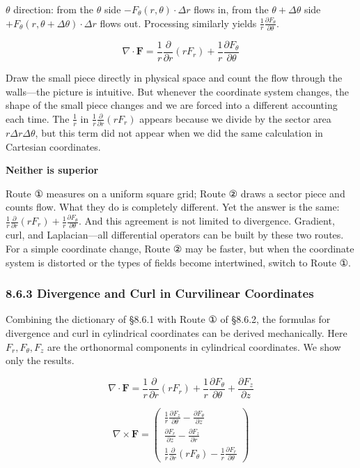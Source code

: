 \documentclass[a4paper,12pt,openany]{book}
\begin{document}
\(\theta\) direction: from the \(\theta\) side
\(-F_\theta(r,\theta) \cdot \Delta r\) flows in, from the
\(\theta+\Delta\theta\) side
\(+F_\theta(r,\theta+\Delta\theta) \cdot \Delta r\) flows out.
Processing similarly yields
\(\frac{1}{r}\frac{\partial F_\theta}{\partial\theta}\).

\[\nabla \cdot \mathbf{F} = \frac{1}{r}\frac{\partial}{\partial r}(r F_r) + \frac{1}{r}\frac{\partial F_\theta}{\partial \theta}\]

Draw the small piece directly in physical space and count the flow
through the walls—the picture is intuitive. But whenever the
coordinate system changes, the shape of the small piece changes and we
are forced into a different accounting each time. The \(\frac{1}{r}\) in
\(\frac{1}{r}\frac{\partial}{\partial r}(rF_r)\) appears because we
divide by the sector area \(r\Delta r\Delta\theta\), but this term did
not appear when we did the same calculation in Cartesian coordinates.

\textbf{Neither is superior}

Route ① measures on a uniform square grid; Route ② draws a sector piece
and counts flow. What they do is completely different. Yet the answer is
the same:
\(\frac{1}{r}\frac{\partial}{\partial r}(rF_r) + \frac{1}{r}\frac{\partial F_\theta}{\partial\theta}\).
And this agreement is not limited to divergence. Gradient, curl, and
Laplacian—all differential operators can be built by these two routes.
For a simple coordinate change, Route ② may be faster, but when the
coordinate system is distorted or the types of fields become
intertwined, switch to Route ①.

\hypertarget{divergence-and-curl-in-curvilinear-coordinates}{%
\subsubsection{8.6.3 Divergence and Curl in Curvilinear
Coordinates}\label{divergence-and-curl-in-curvilinear-coordinates}}

Combining the dictionary of §8.6.1 with Route ① of §8.6.2, the formulas
for divergence and curl in cylindrical coordinates can be derived
mechanically. Here \(F_r,F_\theta,F_z\) are the orthonormal components
in cylindrical coordinates. We show only the results.

\[\nabla \cdot \mathbf{F} = \frac{1}{r}\frac{\partial}{\partial r}(r F_r) + \frac{1}{r}\frac{\partial F_\theta}{\partial \theta} + \frac{\partial F_z}{\partial z}\]

\[\nabla \times \mathbf{F} = \begin{pmatrix}
\frac{1}{r}\frac{\partial F_z}{\partial \theta} - \frac{\partial F_\theta}{\partial z} \\[0.3em]
\frac{\partial F_r}{\partial z} - \frac{\partial F_z}{\partial r} \\[0.3em]
\frac{1}{r}\frac{\partial}{\partial r}(r F_\theta) - \frac{1}{r}\frac{\partial F_r}{\partial \theta}
\end{pmatrix}\]
\end{document}
